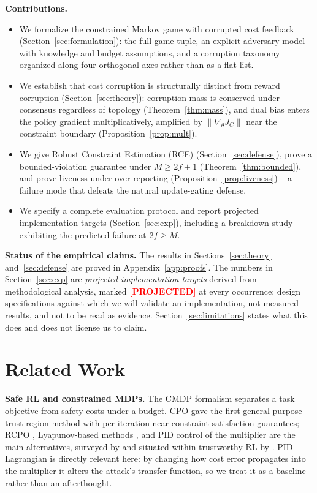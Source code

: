 \documentclass{article}
\newcommand{\projected}{\textcolor{red}{\textbf{[PROJECTED]}}}
\begin{document}
\textbf{Contributions.}
\begin{itemize}
\item We formalize the constrained Markov game with corrupted cost feedback (Section~\ref{sec:formulation}): the full game tuple, an explicit adversary model with knowledge and budget assumptions, and a corruption taxonomy organized along four orthogonal axes rather than as a flat list.
\item We establish that cost corruption is structurally distinct from reward corruption (Section~\ref{sec:theory}): corruption mass is conserved under consensus regardless of topology (Theorem~\ref{thm:mass}), and dual bias enters the policy gradient multiplicatively, amplified by $\|\nabla_\theta J_C\|$ near the constraint boundary (Proposition~\ref{prop:mult}).
\item We give Robust Constraint Estimation (RCE) (Section~\ref{sec:defense}), prove a bounded-violation guarantee under $M \ge 2f+1$ (Theorem~\ref{thm:bounded}), and prove liveness under over-reporting (Proposition~\ref{prop:liveness}) -- a failure mode that defeats the natural update-gating defense.
\item We specify a complete evaluation protocol and report projected implementation targets (Section~\ref{sec:exp}), including a breakdown study exhibiting the predicted failure at $2f \ge M$.
\end{itemize}

\textbf{Status of the empirical claims.} The results in Sections~\ref{sec:theory} and~\ref{sec:defense} are proved in Appendix~\ref{app:proofs}. The numbers in Section~\ref{sec:exp} are \emph{projected implementation targets} derived from methodological analysis, marked \projected{} at every occurrence: design specifications against which we will validate an implementation, not measured results, and not to be read as evidence. Section~\ref{sec:limitations} states what this does and does not license us to claim.

\section{Related Work}
\label{sec:related}

\textbf{Safe RL and constrained MDPs.} The CMDP formalism \citep{altman1999cmdp} separates a task objective from safety costs under a budget. CPO \citep{achiam2017cpo} gave the first general-purpose trust-region method with per-iteration near-constraint-satisfaction guarantees; RCPO \citep{tessler2019rcpo}, Lyapunov-based methods \citep{chow2018lyapunov}, and PID control of the multiplier \citep{stooke2020pid} are the main alternatives, surveyed by \citet{gu2024reviewsaferl} and situated within trustworthy RL by \citet{xu2022trustworthy}. PID-Lagrangian is directly relevant here: by changing how cost error propagates into the multiplier it alters the attack's transfer function, so we treat it as a baseline rather than an afterthought.
\end{document}
